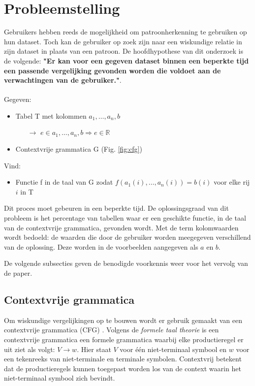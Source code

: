 \documentclass[Main.tex]{subfiles}
\begin{document}
\section{Probleemstelling}
Gebruikers hebben reeds de mogelijkheid om patroonherkenning te gebruiken op hun dataset. Toch kan de gebruiker op zoek zijn naar een wiskundige relatie in zijn dataset in plaats van een patroon. De hoofdhypothese van dit onderzoek is de volgende: \textbf{"Er kan voor een gegeven dataset binnen een beperkte tijd een passende vergelijking gevonden worden die voldoet aan de verwachtingen van de gebruiker."}. \\ \\
\newpage
\noindent
Gegeven: 
\begin{itemize}
\item Tabel T met kolommen $a_{1},\dotsc,a_{n},b$ 
	\begin{itemize}
	\item[$\rightarrow$] $e \in a_{1},\dotsc,a_{n}, b \Rightarrow e \in \mathbb{R}$
	\end{itemize}
\item Contextvrije grammatica G (Fig. \ref{fig:cfg})
\end{itemize}
Vind:
\begin{itemize}
\item Functie f in de taal van G zodat $f(a_{1}(i),\dotsc ,a_{n}(i)) = b(i)$ voor elke rij $i$ in T
\end{itemize}
\noindent
Dit proces moet gebeuren in een beperkte tijd. De oplossingsgraad van dit probleem is het percentage van tabellen waar er een geschikte functie, in de taal van de contextvrije grammatica, gevonden wordt. Met de term kolomwaarden wordt bedoeld: de waarden die door de gebruiker worden meegegeven verschillend van de oplossing. Deze worden in de voorbeelden aangegeven als $a$ en $b$.

\par De volgende subsecties geven de benodigde voorkennis weer voor het vervolg van de paper.

\subsection{Contextvrije grammatica}
Om wiskundige vergelijkingen op te bouwen wordt er gebruik gemaakt van een contextvrije grammatica (CFG) \cite{equationDisc}. Volgens de \textit{formele taal theorie} \cite{cfg} is een contextvrije grammatica een formele grammatica waarbij elke productieregel er uit ziet als volgt: $V \rightarrow w$. Hier staat $V$  voor \'e\'en niet-terminaal symbool en $w$ voor een tekenreeks van niet-terminale en terminale symbolen. Contextvrij betekent dat de productieregels kunnen toegepast worden los van de context waarin het niet-terminaal symbool zich bevindt.
\end{document}
